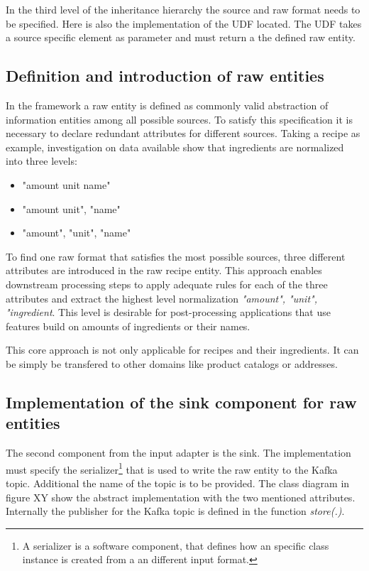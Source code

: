 In the third level of the inheritance hierarchy the source and raw format needs to be specified. Here is also the implementation of the UDF located. The UDF takes a source specific element as parameter and must return a the defined raw entity.

\subsection{Definition and introduction of raw entities}
In the framework a raw entity is defined as commonly valid abstraction of information entities among all possible sources. To satisfy this specification it is necessary to declare redundant attributes for different sources. Taking a recipe as example, investigation on data available show that ingredients are normalized into three levels:
\begin{itemize}
\item "amount unit name"
\item "amount unit", "name"
\item "amount", "unit", "name"
\end{itemize}
To find one raw format that satisfies the most possible sources, three different attributes are introduced in the raw recipe entity. This approach enables downstream processing steps to apply adequate rules for each of the three attributes and extract the highest level normalization \textit{"amount", "unit", "ingredient}. This level is desirable for post-processing applications that use features build on amounts of ingredients or their names.

This core approach is not only applicable for recipes and their ingredients. It can be simply be transfered to other domains like product catalogs or addresses.  

\subsection{Implementation of the sink component for raw entities}

The second component from the input adapter is the sink. The implementation must specify the serializer\footnote{A serializer is a software component, that defines how an specific class instance is created from a an different input format.} that is used to write the raw entity to the Kafka topic. Additional the name of the topic is to be provided. The class diagram in figure XY show the abstract implementation with the two mentioned attributes. Internally the publisher for the Kafka topic is defined in the function \textit{store(.)}.

